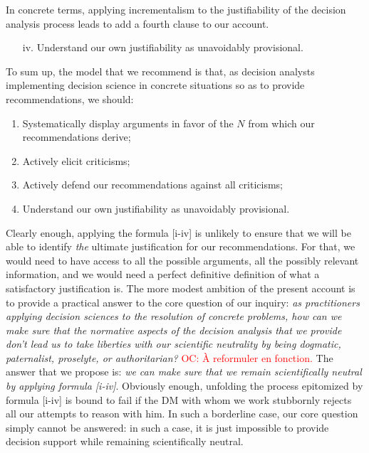 \documentclass[preprint, french, english, 11pt, authoryear]{elsarticle}%
\newcommand{\commentOC}[1]{\textcolor{red}{OC: #1}}
\newcommand{\commentOCf}[1]{\textcolor{red}{\selectlanguage{french}{OC : #1}}}
\begin{document}
In concrete terms, applying incrementalism to the justifiability of the decision analysis process leads to add a fourth clause to our account.
\begin{itemize}
\item[iv.]	Understand our own justifiability as unavoidably provisional.
\end{itemize}

To sum up, the model that we recommend is that, as decision analysts implementing decision science in concrete situations so as to provide recommendations, we should:
\begin{enumerate}[label=\roman*.]
	\item Systematically display arguments in favor of the $N$ from which our recommendations derive;
	\item Actively elicit criticisms;
	\item Actively defend our recommendations against all criticisms;
	\item Understand our own justifiability as unavoidably provisional.
\end{enumerate}

Clearly enough, applying the formula [i-iv] is unlikely to ensure that we will be able to identify \emph{the} ultimate justification for our recommendations. For that, we would need to have access to all the possible arguments, all the possibly relevant information, and we would need a perfect definitive definition of what a satisfactory justification is.  The more modest ambition of the present account is to provide a practical answer to the core question of our inquiry: \emph{as practitioners applying decision sciences to the resolution of concrete problems, how can we make sure that the normative aspects of the decision analysis that we provide don't lead us to take liberties with our scientific neutrality by being dogmatic, paternalist, proselyte, or authoritarian?} \commentOC{À reformuler en fonction.} The answer that we propose is: \emph{we can make sure that we remain scientifically neutral by applying formula [i-iv]}. \commentOCf{Make sure semble trop fort ici.} Obviously enough, unfolding the process epitomized by formula [i-iv] is bound to fail if the \ac{DM} with whom we work stubbornly rejects all our attempts to reason with him. In such a borderline case, our core question simply cannot be answered: in such a case, it is just impossible to provide decision support while remaining scientifically neutral.
\end{document}

